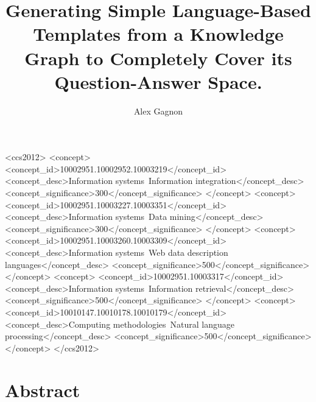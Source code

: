 \documentclass[sigplan,screen]{acmart}
\begin{document}
\title{Generating Simple Language-Based Templates from a Knowledge Graph to Completely Cover its Question-Answer Space.}

\author{Alex Gagnon}

\renewcommand{\shortauthors}{Gagnon}

\begin{CCSXML}
  <ccs2012>
     <concept>
         <concept_id>10002951.10002952.10003219</concept_id>
         <concept_desc>Information systems~Information integration</concept_desc>
         <concept_significance>300</concept_significance>
         </concept>
     <concept>
         <concept_id>10002951.10003227.10003351</concept_id>
         <concept_desc>Information systems~Data mining</concept_desc>
         <concept_significance>300</concept_significance>
         </concept>
     <concept>
         <concept_id>10002951.10003260.10003309</concept_id>
         <concept_desc>Information systems~Web data description languages</concept_desc>
         <concept_significance>500</concept_significance>
         </concept>
     <concept>
         <concept_id>10002951.10003317</concept_id>
         <concept_desc>Information systems~Information retrieval</concept_desc>
         <concept_significance>500</concept_significance>
         </concept>
     <concept>
         <concept_id>10010147.10010178.10010179</concept_id>
         <concept_desc>Computing methodologies~Natural language processing</concept_desc>
         <concept_significance>500</concept_significance>
         </concept>
   </ccs2012>
\end{CCSXML}



\maketitle

\section*{Abstract}
\end{document}
